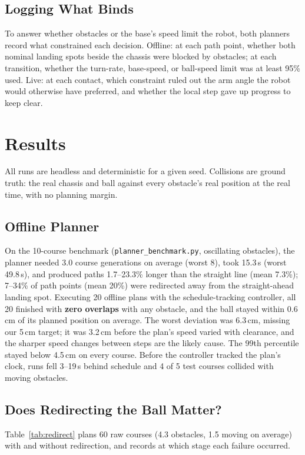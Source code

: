 \documentclass[10pt,twocolumn]{article}
\begin{document}
\subsection{Logging What Binds}
To answer whether obstacles or the base's speed limit the robot, both
planners record what constrained each decision. Offline: at each path
point, whether both nominal landing spots beside the chassis were blocked
by obstacles; at each transition, whether the turn-rate, base-speed, or
ball-speed limit was at least 95\% used. Live: at each contact, which
constraint ruled out the arm angle the robot would otherwise have
preferred, and whether the local step gave up progress to keep clear.

\section{Results}
\label{sec:results}
All runs are headless and deterministic for a given seed. Collisions are
ground truth: the real chassis and ball against every obstacle's real
position at the real time, with no planning margin.

\subsection{Offline Planner}
\label{sec:offline-results}
On the 10-course benchmark (\texttt{planner\_benchmark.py}, oscillating
obstacles), the planner needed 3.0 course generations on average (worst
8), took 15.3\,s (worst 49.8\,s), and produced paths 1.7--23.3\% longer
than the straight line (mean 7.3\%); 7--34\% of path points (mean 20\%)
were redirected away from the straight-ahead landing spot. Executing 20
offline plans with the schedule-tracking controller, all 20 finished with
\textbf{zero overlaps} with any obstacle, and the ball stayed within
0.6\,cm of its planned position on average. The worst deviation was
6.3\,cm, missing our 5\,cm target; it was 3.2\,cm before the plan's speed
varied with clearance, and the sharper speed changes between steps are the
likely cause. The 99th percentile stayed below 4.5\,cm on every course.
Before the controller tracked the plan's clock, runs fell 3--19\,s behind
schedule and 4 of 5 test courses collided with moving obstacles.

\subsection{Does Redirecting the Ball Matter?}
Table~\ref{tab:redirect} plans 60 raw courses (4.3 obstacles, 1.5 moving
on average) with and without redirection, and records at which stage each
failure occurred.
\end{document}
